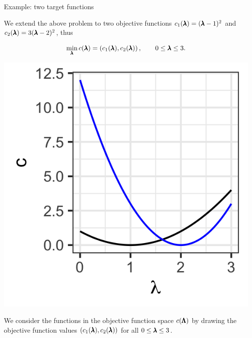 \begin{frame}[allowframebreaks]{Example: two target functions}

We extend the above problem to two objective functions $c_1(\pmb{\lambda}) = (\pmb{\lambda} - 1)^2$ and $c_2(\pmb{\lambda}) = 3(\pmb{\lambda} - 2)^2$, thus

$$
    \min_{\pmb{\lambda}} c(\pmb{\lambda}) = \left(c_1(\pmb{\lambda}), c_2(\pmb{\lambda})\right), \qquad 0 \le \pmb{\lambda} \le 3.
$$

    \begin{center}
    \includegraphics[scale=0.2]{images/graph2}
    \end{center}

\framebreak

We consider the functions in the objective function space $c(\pmb{\Lambda})$ by drawing the objective function values $\left(c_1(\pmb{\lambda}), c_2(\pmb{\lambda})\right)$ for all $0 \le \pmb{\lambda} \le 3$.

\vspace*{0.1cm}



\end{frame}
